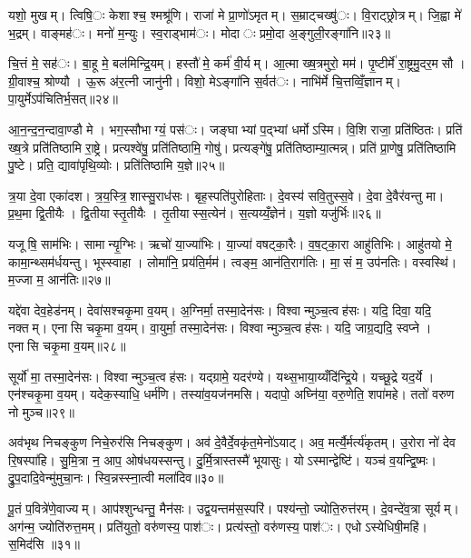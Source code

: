 यशो॒ मुखम्। त्विषि॒ः केशाश्च॒ श्मश्रू॑णि। राजा॑ मे प्रा॒णो॑ऽमृतम्। स॒म्राट्चख्षु॑ः। वि॒राट्छ्रोत्रम्। जि॒ह्वा मे॑ भ॒द्रम्। वाङ्मह॑ः। मनो॑ म॒न्युः। स्व॒राड्भाम॑ः। मोदाः प्रमो॒दा अ॒ङ्गुली॒रङ्गा॑नि॥२३॥

चि॒त्तं मे॒ सह॑ः। बा॒हू मे॒ बल॑मिन्द्रि॒यम्। हस्तौ॑ मे॒ कर्म॑ वी॒र्यम्। आ॒त्मा ख्ष॒त्रमुरो॒ मम॑। पृ॒ष्टीर्मे॑ रा॒ष्ट्रमु॒दर॒मसौ। ग्री॒वाश्च॒ श्रोण्यौ। ऊ॒रू अ॑र॒त्नी जानु॑नी। विशो॒ मेऽङ्गा॑नि स॒र्वत॑ः। नाभि॑र्मे चि॒त्तव्विँ॒ज्ञानम्। पा॒युर्मेऽप॑चितिर्भ॒सत्॥२४॥

आ॒न॒न्द॒न॒न्दावा॒ण्डौ मे। भग॒स्सौभाग्यं॒ पस॑ः। जङ्घाभ्यां प॒द्भ्यां धर्मोऽस्मि। वि॒शि राजा॒ प्रति॑ष्ठितः। प्रति॑ ख्ष॒त्रे प्रति॑तिष्ठामि रा॒ष्ट्रे। प्रत्यश्वे॑षु॒ प्रति॑तिष्ठामि॒ गोषु॑। प्रत्यङ्गे॑षु॒ प्रति॑तिष्ठाम्या॒त्मन्न्। प्रति॑ प्रा॒णेषु॒ प्रति॑तिष्ठामि पु॒ष्टे। प्रति॒ द्यावा॑पृथि॒व्योः। प्रति॑तिष्ठामि य॒ज्ञे॥२५॥

त्र॒या दे॒वा एका॑दश। त्र॒य॒स्त्रि॒शास्सु॒राध॑सः। बृह॒स्पति॑पुरोहिताः। दे॒वस्य॑ सवि॒तुस्स॒वे। दे॒वा दे॒वैर॑वन्तु मा। प्र॒थ॒मा द्वि॒तीयैः। द्वि॒तीयास्तृ॒तीयैः। तृ॒तीयास्स॒त्येन॑। स॒त्यय्यँ॒ज्ञेन॑। य॒ज्ञो यजु॑र्भिः॥२६॥

यजूषि॒ साम॑भिः। सामान्यृ॒ग्भिः। ऋचो॑ या॒ज्या॑भिः। या॒ज्या॑ वषट्का॒रैः। व॒ष॒ट्का॒रा आहु॑तिभिः। आहु॑तयो मे॒ कामा॒न्थ्सम॑र्धयन्तु। भूस्स्वाहा। लोमा॑नि॒ प्रय॑ति॒र्मम॑। त्वङ्म॒ आन॑ति॒राग॑तिः। मा॒सं म॒ उप॑नतिः। वस्वस्थि॑। म॒ज्जा म॒ आन॑तिः॥२७॥


यद्दे॑वा देव॒हेड॑नम्। देवा॑सश्चकृ॒मा व॒यम्। अ॒ग्निर्मा॒ तस्मा॒देन॑सः। विश्वान्मुञ्च॒त्वह॑सः। यदि॒ दिवा॒ यदि॒ नक्तम्। एनासि चकृ॒मा व॒यम्। वा॒युर्मा॒ तस्मा॒देन॑सः। विश्वान्मुञ्च॒त्वह॑सः। यदि॒ जाग्र॒द्यदि॒ स्वप्ने। एनासि चकृ॒मा व॒यम्॥२८॥

सूर्यो॑ मा॒ तस्मा॒देन॑सः। विश्वान्मुञ्च॒त्वह॑सः। यद्ग्रामे॒ यदर॑ण्ये। यथ्स॒भाया॒य्यँदि॑न्द्रि॒ये। यच्छू॒द्रे यद॒र्ये। एन॑श्चकृ॒मा व॒यम्। यदेक॒स्याधि॒ धर्म॑णि। तस्या॑व॒यज॑नमसि। यदापो॒ अघ्नि॑या॒ वरु॒णेति॒ शपा॑महे। ततो॑ वरुण नो मुञ्च॥२९॥

अव॑भृथ निचङ्कुण निचे॒रुर॑सि निचङ्कुण। अव॑ दे॒वैर्दे॒वकृ॑त॒मेनो॑ऽयाट्। अव॒ मर्त्यै॒र्मर्त्य॑कृतम्। उ॒रोरा नो॑ देव रि॒षस्पा॑हि। सु॒मि॒त्रा न॒ आप॒ ओष॑धयस्सन्तु। दु॒र्मि॒त्रास्तस्मै॑ भूयासुः। योऽस्मान्द्वेष्टि॑। यञ्च॑ व॒यन्द्वि॒ष्मः। द्रु॒प॒दादि॒वेन्मु॑मुचा॒नः। स्वि॒न्नस्स्ना॒त्वी मला॑दिव॥३०॥

पू॒तं प॒वित्रे॑णे॒वाज्यम्। आप॑श्शुन्धन्तु॒ मैन॑सः। उद्व॒यन्तम॑स॒स्परि॑। पश्य॑न्तो॒ ज्योति॒रुत्त॑रम्। दे॒वन्दे॑व॒त्रा सूर्यम्। अग॑न्म॒ ज्योति॑रुत्त॒मम्। प्रति॑युतो॒ वरु॑णस्य॒ पाश॑ः। प्रत्य॑स्तो॒ वरु॑णस्य॒ पाश॑ः। एधोऽस्येधिषी॒महि॑। स॒मिद॑सि ॥३१॥

